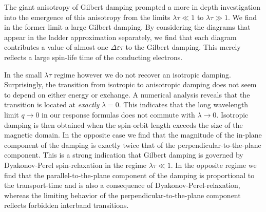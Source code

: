 The giant anisotropy of Gilbert damping prompted a more in depth investigation into the emergence of this anisotropy from the limits $\lambda\tau\ll1$ to $\lambda\tau\gg1$. We find in the former limit a large Gilbert damping. By considering the diagrams that appear in the ladder approximation separately, we find that each diagram contributes a value of almost one $\Delta \varepsilon\tau$ to the Gilbert damping. This merely reflects a large spin-life time of the conducting electrons.

In the small $\lambda\tau$ regime however we do not recover an isotropic damping. Surprisingly, the transition from isotropic to anisotropic damping does not seem to depend on either energy or exchange. A numerical analysis reveals that the transition is located at \emph{exactly} $\lambda=0$. This indicates that the long wavelength limit $q\rightarrow0$ in our response formulas does not commute with $\lambda\rightarrow0$. Isotropic damping is then obtained when the spin-orbit length exceeds the size of the magnetic domain. In the opposite case we find that the magnitude of the in-plane component of the damping is exactly twice that of the perpendicular-to-the-plane component. This is a strong indication that Gilbert damping is governed by Dyakonov-Perel spin-relaxation in the regime $\lambda\tau\ll1$. In the opposite regime we find that 
the parallel-to-the-plane component of the damping is proportional to the transport-time and is also a consequence of Dyakonov-Perel-relaxation, whereas the limiting behavior of the perpendicular-to-the-plane component reflects forbidden interband transitions.

